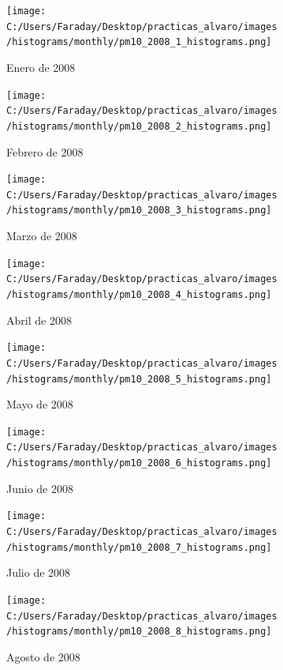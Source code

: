 \documentclass[12pt]{article}
\begin{document}
\newpage

\begin{figure}[H]
\centering
\begin{subfigure}[h]{0.45\textwidth}
\texttt{[image: C:/Users/Faraday/Desktop/practicas\_alvaro/images/histograms/monthly/pm10\_2008\_1\_histograms.png]}
\caption{Enero de 2008}
\label{fig:hist-mon-3-1-2008}
\end{subfigure}
%
\begin{subfigure}[H]{0.45\textwidth}
\texttt{[image: C:/Users/Faraday/Desktop/practicas\_alvaro/images/histograms/monthly/pm10\_2008\_2\_histograms.png]}
\caption{Febrero de 2008}
\label{fig:hist-mon-3-2-2008}
\end{subfigure}
\caption{}
\end{figure}

\begin{figure}[H]
\centering
\begin{subfigure}[h]{0.45\textwidth}
\texttt{[image: C:/Users/Faraday/Desktop/practicas\_alvaro/images/histograms/monthly/pm10\_2008\_3\_histograms.png]}
\caption{Marzo de 2008}
\label{fig:hist-mon-3-3-2008}
\end{subfigure}
%
\begin{subfigure}[H]{0.45\textwidth}
\texttt{[image: C:/Users/Faraday/Desktop/practicas\_alvaro/images/histograms/monthly/pm10\_2008\_4\_histograms.png]}
\caption{Abril de 2008}
\label{fig:hist-mon-3-4-2008}
\end{subfigure}
\caption{}
\end{figure}

\begin{figure}[H]
\centering
\begin{subfigure}[h]{0.45\textwidth}
\texttt{[image: C:/Users/Faraday/Desktop/practicas\_alvaro/images/histograms/monthly/pm10\_2008\_5\_histograms.png]}
\caption{Mayo de 2008}
\label{fig:hist-mon-3-5-2008}
\end{subfigure}
%
\begin{subfigure}[H]{0.45\textwidth}
\texttt{[image: C:/Users/Faraday/Desktop/practicas\_alvaro/images/histograms/monthly/pm10\_2008\_6\_histograms.png]}
\caption{Junio de 2008}
\label{fig:hist-mon-3-6-2008}
\end{subfigure}
\caption{}
\end{figure}

\newpage

\begin{figure}[H]
\centering
\begin{subfigure}[h]{0.45\textwidth}
\texttt{[image: C:/Users/Faraday/Desktop/practicas\_alvaro/images/histograms/monthly/pm10\_2008\_7\_histograms.png]}
\caption{Julio de 2008}
\label{fig:hist-mon-3-7-2008}
\end{subfigure}
%
\begin{subfigure}[H]{0.45\textwidth}
\texttt{[image: C:/Users/Faraday/Desktop/practicas\_alvaro/images/histograms/monthly/pm10\_2008\_8\_histograms.png]}
\caption{Agosto de 2008}
\label{fig:hist-mon-3-8-2008}
\end{subfigure}
\caption{}
\end{figure}
\end{document}
